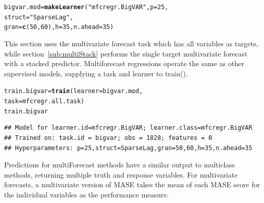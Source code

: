 \documentclass[12pt]{article}\usepackage[]{graphicx}\usepackage[]{color}
\makeatletter
\newcommand{\hlnum}[1]{\textcolor[rgb]{0.686,0.059,0.569}{#1}}%
\newcommand{\hlstr}[1]{\textcolor[rgb]{0.192,0.494,0.8}{#1}}%
\newcommand{\hlstd}[1]{\textcolor[rgb]{0.345,0.345,0.345}{#1}}%
\newcommand{\hlkwb}[1]{\textcolor[rgb]{0.69,0.353,0.396}{#1}}%
\newcommand{\hlkwc}[1]{\textcolor[rgb]{0.333,0.667,0.333}{#1}}%
\newcommand{\hlkwd}[1]{\textcolor[rgb]{0.737,0.353,0.396}{\textbf{#1}}}%
\newenvironment{kframe}{%
 \def\at@end@of@kframe{}%
 \ifinner\ifhmode%
  \def\at@end@of@kframe{\end{minipage}}%
  \begin{minipage}{\columnwidth}%
 \fi\fi%
 \def\FrameCommand##1{\hskip\@totalleftmargin \hskip-\fboxsep
 \colorbox{shadecolor}{##1}\hskip-\fboxsep
     \hskip-\linewidth \hskip-\@totalleftmargin \hskip\columnwidth}%
 \MakeFramed {\advance\hsize-\width
   \@totalleftmargin\z@ \linewidth\hsize
   \@setminipage}}%
 {\par\unskip\endMakeFramed%
 \at@end@of@kframe}
\newenvironment{knitrout}{}{} %
\theoremstyle{definition}
\newcommand\code{\@codex}
\def\@codex#1{{\normalfont\ttfamily\hyphenchar\font=-1 #1}}
\makeatother
\begin{document}
\singlespacing
\begin{knitrout}
\color{fgcolor}\begin{kframe}
\begin{alltt}
\hlstd{bigvar.mod} \hlkwb{=} \hlkwd{makeLearner}\hlstd{(}\hlstr{"mfcregr.BigVAR"}\hlstd{,}\hlkwc{p} \hlstd{=} \hlnum{25}\hlstd{,}
                         \hlkwc{struct} \hlstd{=} \hlstr{"SparseLag"}\hlstd{,}
                         \hlkwc{gran} \hlstd{=} \hlkwd{c}\hlstd{(}\hlnum{50}\hlstd{,} \hlnum{60}\hlstd{),}\hlkwc{h} \hlstd{=} \hlnum{35}\hlstd{,} \hlkwc{n.ahead} \hlstd{=} \hlnum{35}\hlstd{)}
\end{alltt}
\end{kframe}
\end{knitrout}
\doublespacing

This section uses the multivariate forecast task which has all variables as targets, while section~\ref{sub:multiStack} performs the single target multivariate forecast with a stacked predictor. Multiforecast regressions operate the same as other supervised models, supplying a task and learner to \code{train()}.

\singlespacing
\begin{knitrout}
\color{fgcolor}\begin{kframe}
\begin{alltt}
\hlstd{train.bigvar} \hlkwb{=} \hlkwd{train}\hlstd{(}\hlkwc{learner} \hlstd{= bigvar.mod,}
                     \hlkwc{task} \hlstd{= mfcregr.all.task )}
\hlstd{train.bigvar}
\end{alltt}
\end{kframe}
\end{knitrout}

\begin{knitrout}
\color{fgcolor}\begin{kframe}
\begin{verbatim}
## Model for learner.id=mfcregr.BigVAR; learner.class=mfcregr.BigVAR
## Trained on: task.id = bigvar; obs = 1828; features = 0
## Hyperparameters: p=25,struct=SparseLag,gran=50,60,h=35,n.ahead=35
\end{verbatim}
\end{kframe}
\end{knitrout}
\doublespacing

Predictions for \code{multiForecast} methods have a similar output to \code{multiclass} methods, returning multiple truth and response variables. For multivariate forecasts, a multivariate version of MASE takes the mean of each MASE score for the individual variables as the performance measure.
\end{document}
